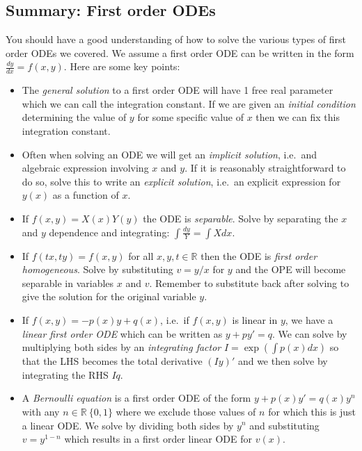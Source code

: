 \subsection{Summary: First order ODEs}

You should have a good understanding of how to solve the various types of first order ODEs we covered. We assume a first order ODE can be written in the form $\frac{dy}{dx} = f(x,y)$. Here are some key points:

\begin{itemize}

\item The \emph{general solution} to a first order ODE will have 1 free real parameter which we can call the integration constant. If we are given an \emph{initial condition} determining the value of $y$ for some specific value of $x$ then we can fix this integration constant.

\item Often when solving an ODE we will get an \emph{implicit solution}, i.e.\ and algebraic expression involving $x$ and $y$. If it is reasonably straightforward to do so, solve this to write an \emph{explicit solution}, i.e.\ an explicit expression for $y(x)$ as a function of $x$.

\item If $f(x,y) = X(x)Y(y)$ the ODE is \emph{separable}. Solve by separating the $x$ and $y$ dependence and integrating: $\int \frac{dy}{Y} = \int X dx$.

\item If $f(tx, ty) = f(x,y)$ for all $x, y, t \in \mathbb{R}$ then the ODE is \emph{first order homogeneous}. Solve by substituting $v = y/x$ for $y$ and the OPE will become separable in variables $x$ and $v$. Remember to substitute back after solving to give the solution for the original variable $y$.

\item If $f(x,y) = -p(x)y + q(x)$, i.e.\ if $f(x,y)$ is linear in $y$, we have a \emph{linear first order ODE} which can be written as $y + py' = q$. We can solve by multiplying both sides by an \emph{integrating factor} $I = \exp(\int p(x) dx)$ so that the LHS becomes the total derivative $(Iy)'$ and we then solve by integrating the RHS $Iq$.

\item A \emph{Bernoulli equation} is a first order ODE of the form $y + p(x) y' = q(x) y^n$ with any $n \in \mathbb{R}\ \{0, 1\}$ where we exclude those values of $n$ for which this is just a linear ODE. We solve by dividing both sides by $y^n$ and substituting $v = y^{1-n}$ which results in a first order linear ODE for $v(x)$.


\end{itemize}
